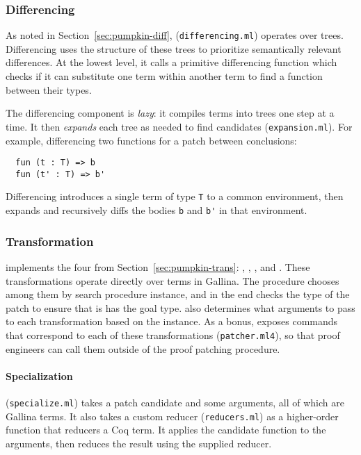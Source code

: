 \subsubsection{Differencing} 
\label{sec:pumpkin-impl-diff}

As noted in Section~\ref{sec:pumpkin-diff},  (\lstinline{differencing.ml}) operates over trees.
Differencing uses the structure of these trees to prioritize semantically relevant differences.
At the lowest level, it calls a primitive differencing function which checks if it can substitute one term within another term to find a function between their types.

The differencing component is \textit{lazy}: it compiles terms into trees one step at a time.
It then \emph{expands} each tree as needed to find candidates (\lstinline{expansion.ml}).
For example, differencing two functions for a patch between conclusions:

\begin{lstlisting}
  fun (t : T) => b
  fun (t' : T) => b'
\end{lstlisting}
Differencing introduces a single term of type \lstinline{T} to a common environment,
then expands and recursively diffs the bodies \lstinline{b} and \lstinline{b'} in that environment.

\subsubsection{Transformation}
\label{sec:pumpkin-impl-trans}

\sysname implements the four  from Section~\ref{sec:pumpkin-trans}:
, , , and .
These transformations operate directly over terms in Gallina.
The \sysname procedure chooses among them by search procedure instance,
and in the end checks the type of the patch to ensure that is has the goal type.
\sysname also determines what arguments to pass to each transformation based on the instance.
As a bonus, \sysname exposes commands that correspond to each of these transformations (\lstinline{patcher.ml4}),
so that proof engineers can call them outside of the proof patching procedure.

\paragraph{Specialization}  (\lstinline{specialize.ml}) takes a patch candidate and some arguments,
all of which are Gallina terms.
It also takes a custom reducer (\lstinline{reducers.ml}) %
as a higher-order function that reducers a Coq term.
It applies the candidate function to the arguments, then reduces the result using the supplied reducer.


